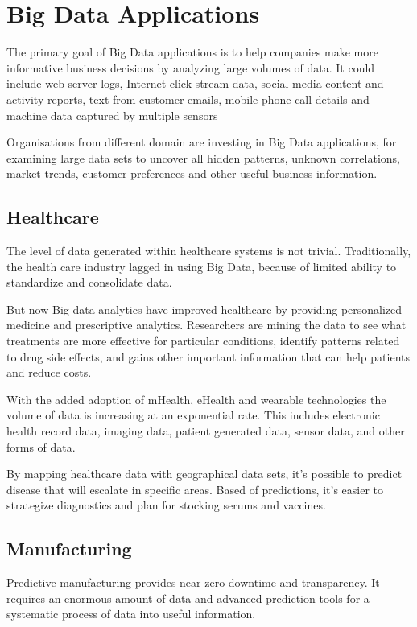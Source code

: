
\section{Big Data Applications}

The primary goal of Big Data applications is to help companies make more informative business decisions by analyzing large volumes of data. It could include web server logs, Internet click stream data, social media content and activity reports, text from customer emails, mobile phone call details and machine data captured by multiple sensors

Organisations from different domain are investing in Big Data applications, for examining large data sets to uncover all hidden patterns, unknown correlations, market trends, customer preferences and other useful business information.
\subsection{Healthcare}

The level of data generated within healthcare systems is not trivial. Traditionally, the health care industry lagged in using Big Data, because of limited ability to standardize and consolidate data.

But now Big data analytics have improved healthcare by providing personalized medicine and prescriptive analytics. Researchers are mining the data to see what treatments are more effective for particular conditions, identify patterns related to drug side effects, and gains other important information that can help patients and reduce costs.

With the added adoption of mHealth, eHealth and wearable technologies the volume of data is increasing at an exponential rate. This includes electronic health record data, imaging data, patient generated data, sensor data, and other forms of data.


By mapping healthcare data with geographical data sets, it’s possible to predict disease that will escalate in specific areas. Based of predictions, it’s easier to strategize diagnostics and plan for stocking serums and vaccines.


\subsection{Manufacturing}
Predictive manufacturing provides near-zero downtime and transparency. It requires an enormous amount of data and advanced prediction tools for a systematic process of data into useful information.


